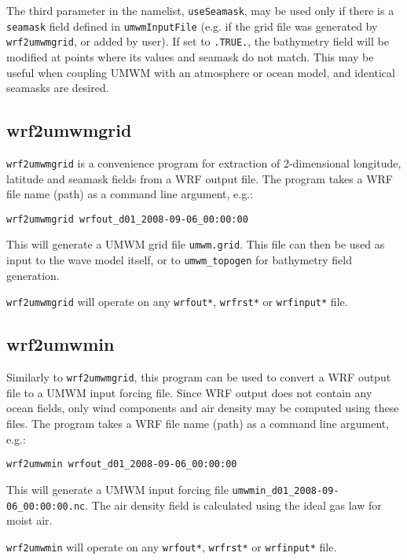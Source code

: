 \documentclass[letterpaper]{article}
\numberwithin{equation}{section}
\begin{document}
The third parameter in the namelist, \verb+useSeamask+, may be used only
if there is a \verb+seamask+ field defined in \verb+umwmInputFile+
(e.g. if the grid file was generated by \verb+wrf2umwmgrid+, or added by user).
If set to \verb+.TRUE.+, the bathymetry field will be modified at points 
where its values and seamask do not match.
This may be useful when coupling UMWM with an atmosphere or ocean model,
and identical seamasks are desired.

\subsection{wrf2umwmgrid}

\verb+wrf2umwmgrid+ is a convenience program for extraction of 
2-dimensional longitude, latitude and seamask fields from a WRF output file.
The program takes a WRF file name (path) as a command line argument, e.g.:

\begin{verbatim}
wrf2umwmgrid wrfout_d01_2008-09-06_00:00:00
\end{verbatim}

This will generate a UMWM grid file \verb+umwm.grid+.
This file can then be used as input to the wave model itself,
or to \verb+umwm_topogen+ for bathymetry field generation.

\verb+wrf2umwmgrid+ will operate on any \verb+wrfout*+, \verb+wrfrst*+ 
or \verb+wrfinput*+ file. 

\subsection{wrf2umwmin}

Similarly to \verb+wrf2umwmgrid+, this program can be used to
convert a WRF output file to a UMWM input forcing file.
Since WRF output does not contain any ocean fields, only wind
components and air density may be computed using these files.
The program takes a WRF file name (path) as a command line argument, e.g.:

\begin{verbatim}
wrf2umwmin wrfout_d01_2008-09-06_00:00:00
\end{verbatim}

This will generate a UMWM input forcing file \verb+umwmin_d01_2008-09-06_00:00:00.nc+.
The air density field is calculated using the ideal gas law for moist air.

\verb+wrf2umwmin+ will operate on any \verb+wrfout*+, \verb+wrfrst*+ 
or \verb+wrfinput*+ file. 
\end{document}
